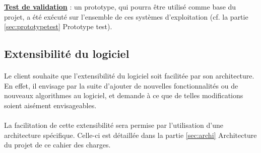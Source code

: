 \textbf{\underline{Test de validation}} : un prototype, qui pourra être utilisé comme base du projet, a été exécuté sur l’ensemble de ces systèmes d’exploitation (cf.  la partie \ref{sec:prototypetest} Prototype test).

\subsection{Extensibilité du logiciel}
\paragraph{}
	Le client souhaite que l’extensibilité du logiciel soit facilitée par son architecture. En effet, il envisage par la suite d’ajouter de nouvelles fonctionnalités ou de nouveaux algorithmes au logiciel, et demande à ce que de telles modifications soient aisément envisageables.
\paragraph{}
	La facilitation de cette extensibilité sera permise par l’utilisation d’une architecture spécifique. Celle-ci est détaillée dans la partie \ref{sec:archi} Architecture du projet de ce cahier des charges.   
